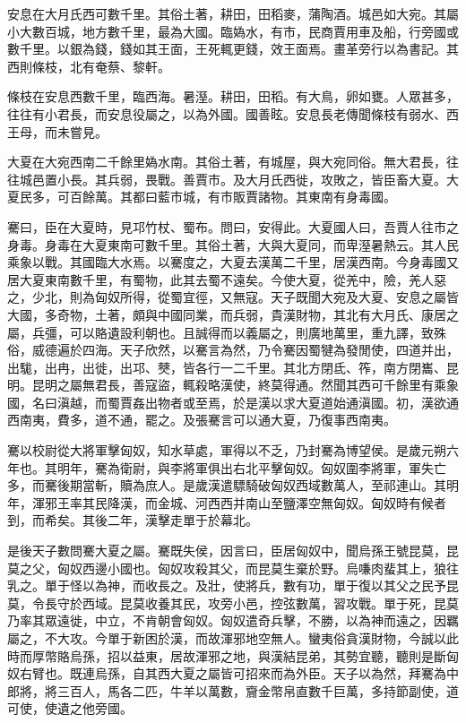 安息在大月氏西可數千里。其俗土著，耕田，田稻麥，蒲陶酒。城邑如大宛。其屬小大數百城，地方數千里，最為大國。臨媯水，有市，民商賈用車及船，行旁國或數千里。以銀為錢，錢如其王面，王死輒更錢，效王面焉。畫革旁行以為書記。其西則條枝，北有奄蔡、黎軒。

條枝在安息西數千里，臨西海。暑溼。耕田，田稻。有大鳥，卵如甕。人眾甚多，往往有小君長，而安息役屬之，以為外國。國善眩。安息長老傳聞條枝有弱水、西王母，而未嘗見。

大夏在大宛西南二千餘里媯水南。其俗土著，有城屋，與大宛同俗。無大君長，往往城邑置小長。其兵弱，畏戰。善賈市。及大月氏西徙，攻敗之，皆臣畜大夏。大夏民多，可百餘萬。其都曰藍市城，有市販賈諸物。其東南有身毒國。

騫曰，臣在大夏時，見邛竹杖、蜀布。問曰，安得此。大夏國人曰，吾賈人往市之身毒。身毒在大夏東南可數千里。其俗土著，大與大夏同，而卑溼暑熱云。其人民乘象以戰。其國臨大水焉。以騫度之，大夏去漢萬二千里，居漢西南。今身毒國又居大夏東南數千里，有蜀物，此其去蜀不遠矣。今使大夏，從羌中，險，羌人惡之，少北，則為匈奴所得，從蜀宜徑，又無寇。天子既聞大宛及大夏、安息之屬皆大國，多奇物，土著，頗與中國同業，而兵弱，貴漢財物，其北有大月氏、康居之屬，兵彊，可以賂遺設利朝也。且誠得而以義屬之，則廣地萬里，重九譯，致殊俗，威德遍於四海。天子欣然，以騫言為然，乃令騫因蜀犍為發閒使，四道并出，出駹，出冉，出徙，出邛、僰，皆各行一二千里。其北方閉氐、筰，南方閉巂、昆明。昆明之屬無君長，善寇盜，輒殺略漢使，終莫得通。然聞其西可千餘里有乘象國，名曰滇越，而蜀賈姦出物者或至焉，於是漢以求大夏道始通滇國。初，漢欲通西南夷，費多，道不通，罷之。及張騫言可以通大夏，乃復事西南夷。

騫以校尉從大將軍擊匈奴，知水草處，軍得以不乏，乃封騫為博望侯。是歲元朔六年也。其明年，騫為衛尉，與李將軍俱出右北平擊匈奴。匈奴圍李將軍，軍失亡多，而騫後期當斬，贖為庶人。是歲漢遣驃騎破匈奴西域數萬人，至祁連山。其明年，渾邪王率其民降漢，而金城、河西西并南山至鹽澤空無匈奴。匈奴時有候者到，而希矣。其後二年，漢擊走單于於幕北。

是後天子數問騫大夏之屬。騫既失侯，因言曰，臣居匈奴中，聞烏孫王號昆莫，昆莫之父，匈奴西邊小國也。匈奴攻殺其父，而昆莫生棄於野。烏嗛肉蜚其上，狼往乳之。單于怪以為神，而收長之。及壯，使將兵，數有功，單于復以其父之民予昆莫，令長守於西域。昆莫收養其民，攻旁小邑，控弦數萬，習攻戰。單于死，昆莫乃率其眾遠徙，中立，不肯朝會匈奴。匈奴遣奇兵擊，不勝，以為神而遠之，因羈屬之，不大攻。今單于新困於漢，而故渾邪地空無人。蠻夷俗貪漢財物，今誠以此時而厚幣賂烏孫，招以益東，居故渾邪之地，與漢結昆弟，其勢宜聽，聽則是斷匈奴右臂也。既連烏孫，自其西大夏之屬皆可招來而為外臣。天子以為然，拜騫為中郎將，將三百人，馬各二匹，牛羊以萬數，齎金幣帛直數千巨萬，多持節副使，道可使，使遺之他旁國。

